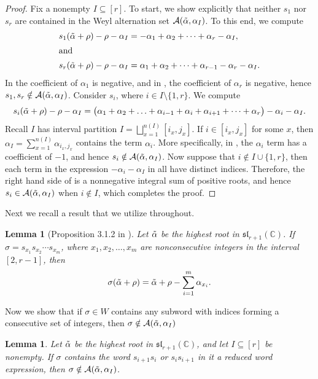 \documentclass[10pt]{article}
\newtheorem{lemma}[theorem]{Lemma}
\newcommand{\speclin}[0]{\mathfrak{sl}_{r+1}(\mathbb{C})}
\newcommand{\hr}[0]{\Tilde{\alpha}}
\newcommand{\newmu}[0]{\alpha_I}
\newcommand{\thealtset}[0]{\mathcal{A}(\hr,\newmu)}
\begin{document}
\begin{proof}
    Fix a nonempty $I\subseteq[r]$. To start, we show explicitly that neither $s_1$ nor $s_r$ are contained in the Weyl alternation set $\thealtset$. To this end, we compute
    \begin{align}
        s_1(\hr+\rho)-\rho-\alpha_I &= -\alpha_1+\alpha_2+\cdots+\alpha_r-\alpha_I\label{eq: apply s1}, \\
        \intertext{and}
        s_r(\hr+\rho)-\rho-\alpha_I &= \alpha_1+\alpha_2+\cdots+\alpha_{r-1}-\alpha_r-\alpha_I\label{eq: apply sr}.
    \end{align}
    In  
    the coefficient of $\alpha_1$ is negative, and in  , the coefficient of $\alpha_r$ is negative, hence $s_1,s_r\notin\mathcal{A}(\hr,\alpha_I)$.
    Consider $s_i$, where $i\in I\setminus \{1,r\}$. 
    We compute
    \begin{equation}
        s_i(\hr+\rho)-\rho-\alpha_I = \big(\alpha_1+\alpha_2+\ldots+\alpha_{i-1}+\alpha_i+\alpha_{i+1}+\cdots+\alpha_r\big)-\alpha_i-\alpha_I\label{eq: si acting on hr + rho}.
    \end{equation}
    Recall $I$ has interval partition $I=\bigsqcup_{x=1}^{n(I)}[i_x,j_x]$.
    If $i\in[i_x,j_x]$ for some $x$, then $\alpha_I=\sum_{x=1}^{n(I)}\alpha_{i_x,j_x}$ contains the term $\alpha_i$. More specifically, in , the $\alpha_i$ term has a coefficient of $-1$, and hence $s_i\notin\mathcal{A}(\hr,\alpha_I)$. 
    Now suppose that $i\notin I\cup\{1,r\}$, then each term in the expression $-\alpha_i-\alpha_I$ in  all have distinct indices. 
    Therefore, the right hand side of  is a nonnegative integral sum of positive roots, and hence $s_i\in \thealtset$ when $i\notin I$, which completes the proof.
\end{proof}
Next we recall a result that we utilize throughout. 
\begin{lemma}[Proposition 3.1.2 in \cite{HarrisThesis}]\label{lemma: spit out the alphas}
    Let $\hr$ be the highest root in $\speclin$. If $\sigma=s_{x_1}s_{x_2}\cdots s_{x_m}$, where $x_1,x_2,\ldots,x_m$ are nonconsecutive integers in the interval $[2,r-1]$, then 
    \[\sigma(\hr+\rho)=\hr+\rho - \sum_{i=1}^m \alpha_{x_i}.\]
\end{lemma}
Now we show that if $\sigma\in W$ contains any subword with indices forming a consecutive set of integers, then $\sigma\notin \mathcal{A}(\hr,\alpha_I)$ 
\begin{lemma}\label{lemma:consecutivegeneral}
    Let $\hr$ be the highest root in $\speclin$, and 
    let 
    $I\subseteq [r]$ be nonempty. 
    If $\sigma$ contains the word $s_{i+1}s_i$ or $s_is_{i+1}$ in it a reduced word expression, then $\sigma\notin \mathcal{A}(\hr,\alpha_I)$.
\end{lemma}
\end{document}
